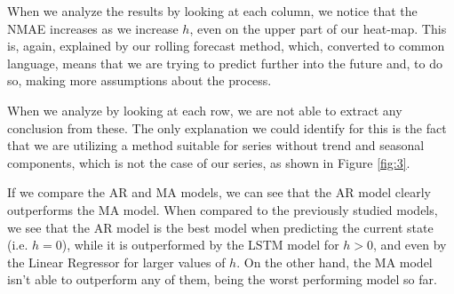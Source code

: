 \documentclass[10pt]{article}
\begin{document}
When we analyze the results by looking at each column, we notice that the \textsc{NMAE} increases as we increase $h$, even on the upper part of our heat-map. This is, again, explained by our rolling forecast method, which, converted to common language, means that we are trying to predict further into the future and, to do so, making more assumptions about the process. 

When we analyze by looking at each row, we are not able to extract any conclusion from these. The only explanation we could identify for this is the fact that we are utilizing a method suitable for series without trend and seasonal components, which is not the case of our series, as shown in Figure \ref{fig:3}.

If we compare the AR and MA models, we can see that the AR model clearly outperforms the MA model. When compared to the previously studied models, we see that the AR model is the best model when predicting the current state (i.e. $h=0$), while it is outperformed by the LSTM model for $h>0$, and even by the Linear Regressor for larger values of $h$. On the other hand, the MA model isn't able to outperform any of them, being the worst performing model so far.

\printbibliography
\end{document}
